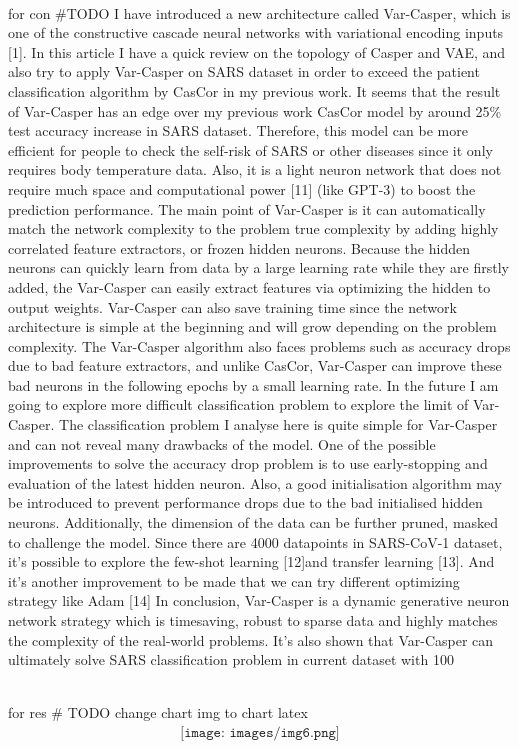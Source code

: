 \\for con
\#TODO
I have introduced a new architecture called Var-Casper, which is one of the constructive cascade neural networks with variational encoding inputs [1]. In this article I have a quick review on the topology of Casper and VAE, and also try to apply Var-Casper on SARS dataset in order to exceed the patient classification algorithm by CasCor in my previous work. It seems that the result of Var-Casper has an edge over my previous work CasCor model by around 25\% test accuracy increase in SARS dataset. Therefore, this model can be more efficient for people to check the self-risk of SARS or other diseases since it only requires body temperature data. Also, it is a light neuron network that does not require much space and computational power [11] (like GPT-3) to boost the prediction performance. The main point of Var-Casper is it can automatically match the network complexity to the problem true complexity by adding highly correlated feature extractors, or frozen hidden neurons. Because the hidden neurons can quickly learn from data by a large learning rate while they are firstly added, the Var-Casper can easily extract features via optimizing the hidden to output weights. Var-Casper can also save training time since the network architecture is simple at the beginning and will grow depending on the problem complexity. The Var-Casper algorithm also faces problems such as accuracy drops due to bad feature extractors, and unlike CasCor, Var-Casper can improve these bad neurons in the following epochs by a small learning rate. 
   In the future I am going to explore more difficult classification problem to explore the limit of Var-Casper. The classification problem I analyse here is quite simple for Var-Casper and can not reveal many drawbacks of the model. One of the possible improvements to solve the accuracy drop problem is to use early-stopping and evaluation of the latest hidden neuron. Also, a good initialisation algorithm may be introduced to prevent performance drops due to the bad initialised hidden neurons. Additionally, the dimension of the data can be further pruned, masked to challenge the model. Since there are 4000 datapoints in SARS-CoV-1 dataset, it’s possible to explore the few-shot learning [12]and transfer learning [13]. And it’s another improvement to be made that we can try different optimizing strategy like Adam [14]
In conclusion, Var-Casper is a dynamic generative neuron network strategy which is timesaving, robust to sparse data and highly matches the complexity of the real-world problems. It’s also shown that Var-Casper can ultimately solve SARS classification problem in current dataset with 100%

\\for res
\# TODO change chart img to chart latex
\begin{align*}
\texttt{[image: images/img6.png]}    
\end{align*}
